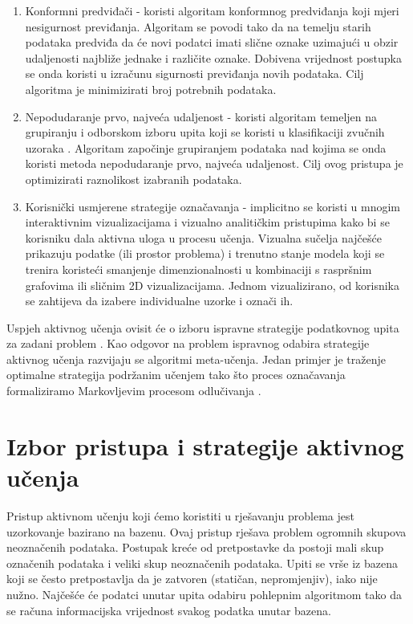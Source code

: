 \documentclass[times, utf8, zavrsni, numeric]{fer}
\begin{document}
\begin{enumerate}
    \item Konformni predviđači - koristi algoritam konformnog predviđanja koji mjeri nesigurnost previđanja. Algoritam se povodi tako da na temelju starih podataka predviđa da će novi podatci imati slične oznake uzimajući u obzir udaljenosti najbliže jednake i različite oznake. Dobivena vrijednost postupka se onda koristi u izračunu sigurnosti previđanja novih podataka. Cilj algoritma je minimizirati broj potrebnih podataka. \citep{konformni2020blog}
    \item Nepodudaranje prvo, najveća udaljenost - koristi algoritam temeljen na grupiranju i odborskom izboru upita koji se koristi u klasifikaciji zvučnih uzoraka . Algoritam započinje grupiranjem podataka nad kojima se onda koristi metoda nepodudaranje prvo, najveća udaljenost. Cilj ovog pristupa je optimizirati raznolikost izabranih podataka. \citep{shuyang2018active}
    \item Korisnički usmjerene strategije označavanja - implicitno se koristi u mnogim interaktivnim vizualizacijama i vizualno analitičkim pristupima kako bi se korisniku dala aktivna uloga u procesu učenja. Vizualna sučelja najčešće prikazuju podatke (ili prostor problema) i trenutno stanje modela koji se trenira koristeći smanjenje dimenzionalnosti u kombinaciji s raspršnim grafovima ili sličnim 2D vizualizacijama. Jednom vizualizirano, od korisnika se zahtijeva da izabere individualne uzorke i označi ih. \citep{bernard2018towards}
\end{enumerate}

Uspjeh aktivnog učenja ovisit će o izboru ispravne strategije podatkovnog upita za zadani problem \citep{kumar2020active}. Kao odgovor na problem ispravnog odabira strategije aktivnog učenja razvijaju se algoritmi \glqq{}meta-učenja\grqq{}. Jedan primjer je traženje optimalne strategija podržanim učenjem tako što proces označavanja formaliziramo Markovljevim procesom odlučivanja \citep{konyushkova2018discovering}.

\section{Izbor pristupa i strategije aktivnog učenja}
\label{sec:izbor_aktivno}

Pristup aktivnom učenju koji ćemo koristiti u rješavanju problema jest uzorkovanje bazirano na bazenu.
Ovaj pristup rješava problem ogromnih skupova neoznačenih podataka. Postupak kreće od pretpostavke da postoji mali skup označenih podataka i veliki skup neoznačenih podataka. Upiti se vrše iz bazena koji se često pretpostavlja da je zatvoren (statičan, nepromjenjiv), iako nije nužno. Najčešće će podatci unutar upita odabiru pohlepnim algoritmom tako da se računa informacijska vrijednost svakog podatka unutar bazena. \citep{settles2009active}
\end{document}
